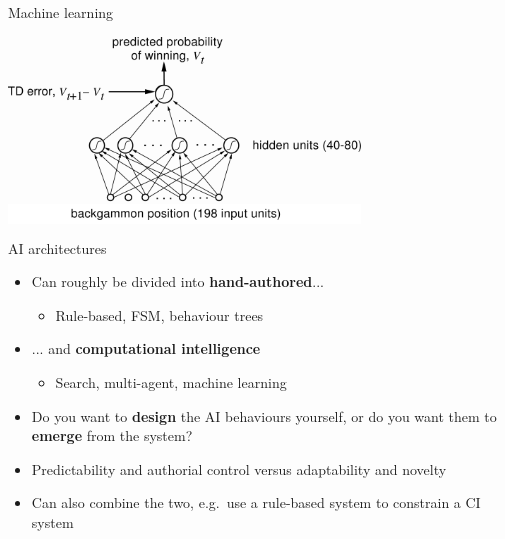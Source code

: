 \begin{frame}{Machine learning}
	\begin{center}
		\colorbox{white}{
			\includegraphics[width=0.7\textwidth]{tdgammon}
		}
	\end{center}
\end{frame}

\begin{frame}{AI architectures}
	\begin{itemize}
		\pause\item Can roughly be divided into \textbf{hand-authored}...
			\begin{itemize}
				\pause\item Rule-based, FSM, behaviour trees
			\end{itemize}
		\pause\item ... and \textbf{computational intelligence}
			\begin{itemize}
				\pause\item Search, multi-agent, machine learning
			\end{itemize}
		\pause\item Do you want to \textbf{design} the AI behaviours yourself,
			or do you want them to \textbf{emerge} from the system?
		\pause\item Predictability and authorial control versus adaptability and novelty
		\pause\item Can also combine the two, e.g.\ use a rule-based system to constrain a CI system
	\end{itemize}
\end{frame}
